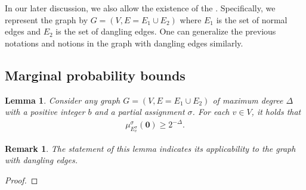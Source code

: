 \documentclass[11pt]{article}
\newtheorem{lemma}[theorem]{Lemma}
\newtheorem*{remark}{Remark}
\newcommand{\set}[1]{\left\{#1\right\}}
\newcommand{\qgl}[1]{{\color{purple}{#1}}}
\begin{document}
    In our later discussion, {we also allow the existence of the \qgl{dangling edges}}. Specifically, we represent the graph by $G=(V,E=E_1\cup E_2)$ where $E_1$ is the set of normal edges and $E_2$ is the set of dangling edges.
    {One can generalize the previous notations and notions in the graph with dangling edges similarly.} 

    

    
\subsection{Marginal probability bounds}
\begin{lemma}\label{lem:marginal-bound}
    Consider any graph $G=(V,E=E_1\cup E_2)$ of maximum degree $\Delta$ with a positive integer $b$ and a partial assignment $\sigma$. For each $v\in V$, it holds that  
    \begin{align*}
         \mu^{\sigma}_{E^{\sigma}_v}(\boldsymbol{0})\geq {2^{-\Delta}}.
    \end{align*} 
\end{lemma}
\begin{remark}
    The statement of this lemma indicates its applicability to the graph with dangling edges.
\end{remark}
\begin{proof}
    \qgl{immediately from czc's paper.}
\end{proof}


\end{document}
